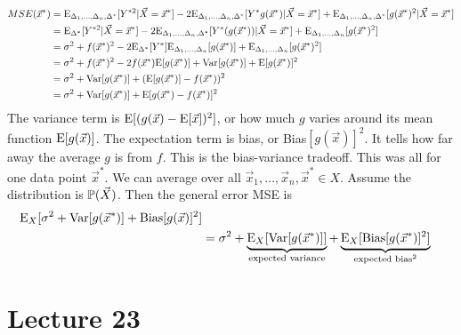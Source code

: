 \documentclass[12pt]{article}
\begin{document}
$$ \begin{aligned} MSE(\vec{x}^*) &= \mathrm{E}_{\Delta_1,\dots,\Delta_n,\Delta^*}[Y^{*2} | \vec{X} = \vec{x}^*] - 2\mathrm{E}_{\Delta_1,\dots,\Delta_n,\Delta^*}[Y^*g(\vec{x}^*) | \vec{X} = \vec{x}^*] + \mathrm{E}_{\Delta_1,\dots,\Delta_n, \Delta^*}[g(\vec{x}^*)^2 | \vec{X} = \vec{x}^*] \\ &= \mathrm{E}_{\Delta^*}[Y^{*2} | \vec{X} = \vec{x}^*] - 2\mathrm{E}_{\Delta_1,\dots,\Delta_n,\Delta^*}[Y^*(g(\vec{x}^*)) | \vec{X} = \vec{x}^*] + \mathrm{E}_{\Delta_1,\dots,\Delta_n}[g(\vec{x}^*)^2] \\ &= \sigma^2 + f(\vec{x}^*)^2 - 2\mathrm{E}_{\Delta^*}[Y^*]\mathrm{E}_{\Delta_1,\dots,\Delta_n}[g(\vec{x}^*)] + \mathrm{E}_{\Delta_1,\dots,\Delta_n}[g(\vec{x}^*)^2] \\ &= \sigma^2 + f(\vec{x}^*)^2 - 2f(\vec{x}^*)\mathrm{E}[ g(\vec{x}^*) ] + \mathrm{Var}[ g(\vec{x}^*) ] + \mathrm{E}[ g(\vec{x}^*) ]^2 \\ &= \sigma^2 + \mathrm{Var}[ g(\vec{x}^*) ] + (\mathrm{E}[ g(\vec{x}^*) ] - f(\vec{x}^*))^2 \\ &= \sigma^2 + \mathrm{Var}[ g(\vec{x}^*) ] + \mathrm{E}[ g(\vec{x}^*) - f(\vec{x}^*) ]^2 \end{aligned} $$ 
The variance term is $\mathrm{E}[ (g(\vec{x}) - \mathrm{E}[ \vec{x} ])^2 ]$, or how much $g$ varies around its mean function $\mathrm{E}[ g(\vec{x}) ]$. The expectation term is bias, or Bias$[g(\vec{x})]^2$. It tells how far away the average $g$ is from $f$. This is the bias-variance tradeoff. This was all for one data point $\vec{x}^*$. We can average over all $\vec{x}_1,\dots,\vec{x}_n,\vec{x}^* \in X$. Assume the distribution is $\mathbb{P}(\vec{X})$. Then the general error MSE is $$ \begin{aligned} \mathrm{E}_X[\sigma^2 + \mathrm{Var}[ g(\vec{x}^*) ] + \text{Bias}[g(\vec{x})]^2] \\ &= \sigma^2 + \underbrace{\mathrm{E}_X[\mathrm{Var}[ g(\vec{x}^*) ]]}_{\text{expected variance}} + \underbrace{\mathrm{E}_X[\text{Bias}[g(\vec{x}^*)]^2]}_{\text{expected bias}^2} \end{aligned} $$ 


\section{Lecture 23} 
\end{document}
